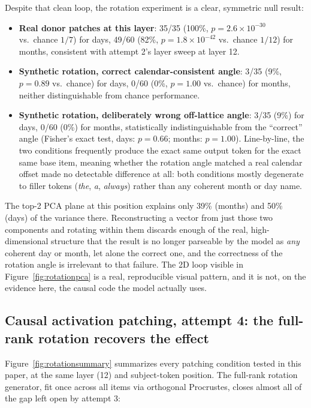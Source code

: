 \documentclass[11pt]{article}
\begin{document}
Despite that clean loop, the rotation experiment is a clear, symmetric null
result:

\begin{itemize}
  \item \textbf{Real donor patches at this layer}: 35/35 (100\%, $p = 2.6
        \times 10^{-30}$ vs.\ chance $1/7$) for days, 49/60 (82\%, $p = 1.8
        \times 10^{-42}$ vs.\ chance $1/12$) for months, consistent with
        attempt 2's layer sweep at layer 12.
  \item \textbf{Synthetic rotation, correct calendar-consistent angle}: 3/35
        (9\%, $p = 0.89$ vs.\ chance) for days, 0/60 (0\%, $p = 1.00$ vs.\
        chance) for months, neither distinguishable from chance
        performance.
  \item \textbf{Synthetic rotation, deliberately wrong off-lattice angle}:
        3/35 (9\%) for days, 0/60 (0\%) for months, statistically
        indistinguishable from the ``correct'' angle (Fisher's exact test,
        days: $p = 0.66$; months: $p = 1.00$). Line-by-line, the two
        conditions frequently produce the exact same output token for the
        exact same base item, meaning whether the rotation angle matched a
        real calendar offset made no detectable difference at all: both
        conditions mostly degenerate to filler tokens (\emph{the}, \emph{a},
        \emph{always}) rather than any coherent month or day name.
\end{itemize}

The top-2 PCA plane at this position explains only 39\% (months) and 50\%
(days) of the variance there. Reconstructing a vector from just those two
components and rotating within them discards enough of the real,
high-dimensional structure that the result is no longer parseable by the
model as \emph{any} coherent day or month, let alone the correct one, and the
correctness of the rotation angle is irrelevant to that failure. The 2D loop
visible in Figure~\ref{fig:rotationpca} is a real, reproducible visual
pattern, and it is not, on the evidence here, the causal code the model
actually uses.

\subsection{Causal activation patching, attempt 4: the full-rank rotation recovers the effect}
\label{sec:highdimresult}

Figure~\ref{fig:rotationsummary} summarizes every patching condition tested
in this paper, at the same layer (12) and subject-token position. The
full-rank rotation generator, fit once across all items via orthogonal
Procrustes, closes almost all of the gap left open by attempt 3:
\end{document}
